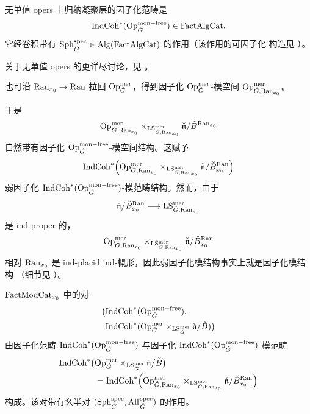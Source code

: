 \begin{definition}
\label{def:indcoh-opers}
无单值 opers 上归纳凝聚层的因子化范畴是
\[
\mathrm{IndCoh}^{*}(\mathrm{Op}^{\mathrm{mon-free}}_{\check G})\in \mathrm{FactAlgCat} .
\]
它经卷积带有 $\mathrm{Sph}^{\mathrm{spec}}_{\check G}\in \mathrm{Alg}(\mathrm{FactAlgCat})$ 的作用（该作用的可因子化
构造见 \cite[附录 E.8]{ABC+24a}）。
\end{definition}

\begin{remark}
\label{rem:monfree}
关于无单值 opers 的更详尽讨论，见 \cite[3 节]{ABC+24a}。
\end{remark}

也可沿 $\mathrm{Ran}_{x_0}\to \mathrm{Ran}$ 拉回 $\mathrm{Op}^{\mathrm{mer}}_{\check G}$，得到因子化
$\mathrm{Op}^{\mathrm{mer}}_{\check G}$-模空间
$\mathrm{Op}^{\mathrm{mer}}_{\check G,\mathrm{Ran}_{x_0}}$。

于是
\[
\mathrm{Op}^{\mathrm{mer}}_{\check G,\mathrm{Ran}_{x_0}}
\times_{\mathrm{LS}^{\mathrm{mer}}_{\check G,\mathrm{Ran}_{x_0}}}
\check{\mathfrak{n}}/\check B^{\mathrm{Ran}_{x_0}}
\]
自然带有因子化 $\mathrm{Op}^{\mathrm{mon-free}}_{\check G}$-模空间结构。这赋予
\[
\mathrm{IndCoh}^{*}\Bigl(\mathrm{Op}^{\mathrm{mer}}_{\check G,\mathrm{Ran}_{x_0}}
\times_{\mathrm{LS}^{\mathrm{mer}}_{\check G,\mathrm{Ran}_{x_0}}}
\check{\mathfrak{n}}/\check B^{\mathrm{Ran}}_{x_0}\Bigr)
\]
弱因子化 $\mathrm{IndCoh}^{*}(\mathrm{Op}^{\mathrm{mon-free}}_{\check G})$-模范畴结构。然而，由于
\[
\check{\mathfrak{n}}/\check B^{\mathrm{Ran}}_{x_0}
\longrightarrow \mathrm{LS}^{\mathrm{mer}}_{\check G,\mathrm{Ran}_{x_0}}
\]
是 ind-proper 的，
\[
\mathrm{Op}^{\mathrm{mer}}_{\check G,\mathrm{Ran}_{x_0}}
\times_{\mathrm{LS}^{\mathrm{mer}}_{\check G,\mathrm{Ran}_{x_0}}}
\check{\mathfrak{n}}/\check B^{\mathrm{Ran}}_{x_0}
\]
相对 $\mathrm{Ran}_{x_0}$ 是 ind-placid ind-概形，因此弱因子化模结构事实上就是因子化模结构
（细节见 \cite[附录 B.13]{ABC+24a}）。

\begin{definition}
\label{def:ifle-pair}
$\mathrm{FactModCat}_{x_0}$ 中的对
\begin{align*}
\bigl(&\mathrm{IndCoh}^{*}(\mathrm{Op}^{\mathrm{mon-free}}_{\check G}),\\
&\mathrm{IndCoh}^{*}(\mathrm{Op}^{\mathrm{mer}}_{\check G}\times_{\mathrm{LS}^{\mathrm{mer}}_{\check G}}
\check{\mathfrak{n}}/\check B)\bigr)
\end{align*}
由因子化范畴 $\mathrm{IndCoh}^{*}(\mathrm{Op}^{\mathrm{mon-free}}_{\check G})$ 与因子化
$\mathrm{IndCoh}^{*}(\mathrm{Op}^{\mathrm{mon-free}}_{\check G})$-模范畴
\begin{align*}
\mathrm{IndCoh}^{*}\bigl(&\mathrm{Op}^{\mathrm{mer}}_{\check G}\times_{\mathrm{LS}^{\mathrm{mer}}_{\check G}}
\check{\mathfrak{n}}/\check B\bigr)\\
&=\mathrm{IndCoh}^{*}\Bigl(\mathrm{Op}^{\mathrm{mer}}_{\check G,\mathrm{Ran}_{x_0}}
\times_{\mathrm{LS}^{\mathrm{mer}}_{\check G,\mathrm{Ran}_{x_0}}}
\check{\mathfrak{n}}/\check B^{\mathrm{Ran}}_{x_0}\Bigr)
\end{align*}
构成。该对带有幺半对 $(\mathrm{Sph}^{\mathrm{spec}}_{\check G},\mathrm{Aff}^{\mathrm{spec}}_{\check G})$ 的作用。
\end{definition}
